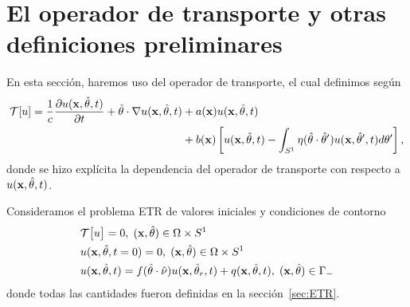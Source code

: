 \section{El operador de transporte y otras definiciones preliminares}
En esta sección, haremos uso del operador de transporte, el cual definimos
según
\begin{equation}
\begin{split}
\mathcal{T}[u]=\frac{1}
{c}\frac{\partial u(\mathbf{x},\hat{\theta},t)}{\partial t} + \hat{\theta} \cdot \nabla u(\mathbf{x},\hat{\theta},t)&+a(\mathbf{x})u(\mathbf{x},\hat{\theta},t)\\
&+b(\mathbf{x})\left[u(\mathbf{x},\hat{\theta},t) - \int_{S^1}\eta(\hat{\theta}\cdot\hat{\theta} ') u(\mathbf{x},\hat{\theta}',t) d\theta'\right],
\end{split}
\label{eq:Toper}
\end{equation}
donde se hizo explícita la dependencia del operador de transporte  
con respecto a $u(\mathbf{x},\hat{\theta},t)$. 

Consideramos el problema ETR de valores iniciales y condiciones 
de contorno
\begin{equation}
\begin{split}
\begin{aligned}
&\mathcal{T}\big[u\big]=0, \;  (\mathbf{x},\hat{\theta})  \in \Omega\times S^1\\
&u(\mathbf{x},\hat{\theta},t=0)=0, \;  (\mathbf{x},\hat{\theta})  \in \Omega\times S^1 \\
&u(\mathbf{x},\hat{\theta},t)=f(\hat{\theta} \cdot \hat{\nu}) u(\mathbf{x},\hat{\theta}_r,t) + q(\mathbf{x},\hat{\theta},t) , \; (\mathbf{x},\hat{\theta}) \in \Gamma_-
\end{aligned}
\end{split}
\label{eq:RTEt}
\end{equation}
donde todas las cantidades fueron definidas en la sección~\ref{sec:ETR}.



